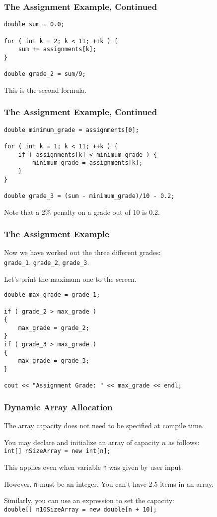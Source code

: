 \begin{frame}[fragile]
\frametitle{The Assignment Example, Continued}

\begin{verbatim}
double sum = 0.0;

for ( int k = 2; k < 11; ++k ) {
    sum += assignments[k];
}

double grade_2 = sum/9;
\end{verbatim}

This is the second formula.

\end{frame}

\begin{frame}[fragile]
\frametitle{The Assignment Example, Continued}
\begin{verbatim}
double minimum_grade = assignments[0];

for ( int k = 1; k < 11; ++k ) {
    if ( assignments[k] < minimum_grade ) {
        minimum_grade = assignments[k];
    }
}

double grade_3 = (sum - minimum_grade)/10 - 0.2;
\end{verbatim}

Note that a 2\% penalty on a grade out of 10 is 0.2.

\end{frame}

\begin{frame}[fragile]
\frametitle{The Assignment Example}
Now we have worked out the three different grades:\\
\quad \texttt{grade\_1}, \texttt{grade\_2}, \texttt{grade\_3}.

Let's print the maximum one to the screen.

\begin{verbatim}
double max_grade = grade_1;

if ( grade_2 > max_grade )
{
    max_grade = grade_2;
}
if ( grade_3 > max_grade )
{
    max_grade = grade_3;
}

cout << "Assignment Grade: " << max_grade << endl;

\end{verbatim}

\end{frame}



\begin{frame}
\frametitle{Dynamic Array Allocation}

The array capacity does not need to be specified at compile time.

You may declare and initialize an array of capacity $n$ as follows:\\
\quad \texttt{int[] nSizeArray = new int[n];}

This applies even when variable \texttt{n} was given by user input.

However, \texttt{n} must be an integer. You can't have 2.5 items in an array.

Similarly, you can use an expression to set the capacity:\\
\quad \texttt{double[] n10SizeArray = new double[n + 10];}

\end{frame}

